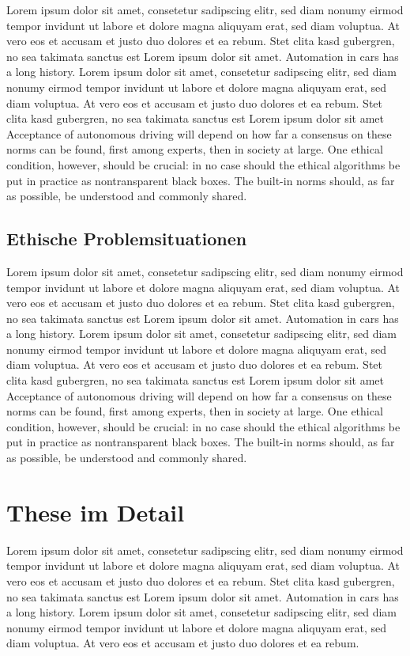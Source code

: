 Lorem ipsum dolor sit amet, consetetur sadipscing elitr, sed diam nonumy eirmod tempor invidunt ut labore et dolore magna aliquyam erat, sed diam voluptua.
At vero eos et accusam et justo duo dolores et ea rebum.
Stet clita kasd gubergren, no sea takimata sanctus est Lorem ipsum dolor sit amet.
Automation in cars has a long history.  Lorem ipsum dolor sit amet, consetetur sadipscing elitr, sed diam nonumy eirmod tempor invidunt ut labore et dolore magna aliquyam erat, sed diam voluptua.
At vero eos et accusam et justo duo dolores et ea rebum.
Stet clita kasd gubergren, no sea takimata sanctus est Lorem ipsum dolor sit amet Acceptance of autonomous driving will depend on how far a consensus on these norms can be found, first among experts, then in society at large.
One ethical condition, however, should be crucial: in no case should the ethical algorithms be put in practice as nontransparent black boxes.
The built-in norms should, as far as possible, be understood and commonly shared.


\subsection{Ethische Problemsituationen}

Lorem ipsum dolor sit amet, consetetur sadipscing elitr, sed diam nonumy eirmod tempor invidunt ut labore et dolore magna aliquyam erat, sed diam voluptua.
At vero eos et accusam et justo duo dolores et ea rebum.
Stet clita kasd gubergren, no sea takimata sanctus est Lorem ipsum dolor sit amet.
Automation in cars has a long history.  Lorem ipsum dolor sit amet, consetetur sadipscing elitr, sed diam nonumy eirmod tempor invidunt ut labore et dolore magna aliquyam erat, sed diam voluptua.
At vero eos et accusam et justo duo dolores et ea rebum.
Stet clita kasd gubergren, no sea takimata sanctus est Lorem ipsum dolor sit amet Acceptance of autonomous driving will depend on how far a consensus on these norms can be found, first among experts, then in society at large.
One ethical condition, however, should be crucial: in no case should the ethical algorithms be put in practice as nontransparent black boxes.
The built-in norms should, as far as possible, be understood and commonly shared.

\section{These im Detail}

Lorem ipsum dolor sit amet, consetetur sadipscing elitr, sed diam nonumy eirmod tempor invidunt ut labore et dolore magna aliquyam erat, sed diam voluptua.
At vero eos et accusam et justo duo dolores et ea rebum.
Stet clita kasd gubergren, no sea takimata sanctus est Lorem ipsum dolor sit amet.
Automation in cars has a long history.  Lorem ipsum dolor sit amet, consetetur sadipscing elitr, sed diam nonumy eirmod tempor invidunt ut labore et dolore magna aliquyam erat, sed diam voluptua.
At vero eos et accusam et justo duo dolores et ea rebum.


